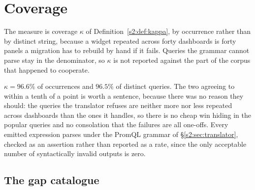 
\section{Coverage}
\label{s2:sec:coverage}

The measure is coverage $\kappa$ of Definition~\ref{s2:def:kappa}, by occurrence rather
than by distinct string, because a widget repeated across forty dashboards is forty panels
a migration has to rebuild by hand if it fails. Queries the grammar cannot parse stay in
the denominator, so $\kappa$ is not reported against the part of the corpus that happened
to cooperate.

\begin{table}[htbp]\centering\footnotesize

\caption{Translation outcomes over the $8{,}770$ Datadog metric query occurrences. Every
$\bot$ carries a gap code and appears in Table~\ref{s2:tab:gaps}; the unparsed row is kept
in the denominator so that $\kappa$ is a statement about the corpus rather than about the
parsable part of it.}
\label{s2:tab:coverage}
\end{table}

\noindent
$\kappa = 96.6\%$ of occurrences and $96.5\%$ of distinct queries. The two agreeing to
within a tenth of a point is worth a sentence, because there was no reason they should: the
queries the translator refuses are neither more nor less repeated across dashboards than
the ones it handles, so there is no cheap win hiding in the popular queries and no
consolation that the failures are all one-offs. Every emitted expression parses under the
PromQL grammar of \S\ref{s2:sec:translator}, checked as an assertion rather than reported
as a rate, since the only acceptable number of syntactically invalid outputs is zero.

\subsection{The gap catalogue}
\label{s2:sec:gaps}

